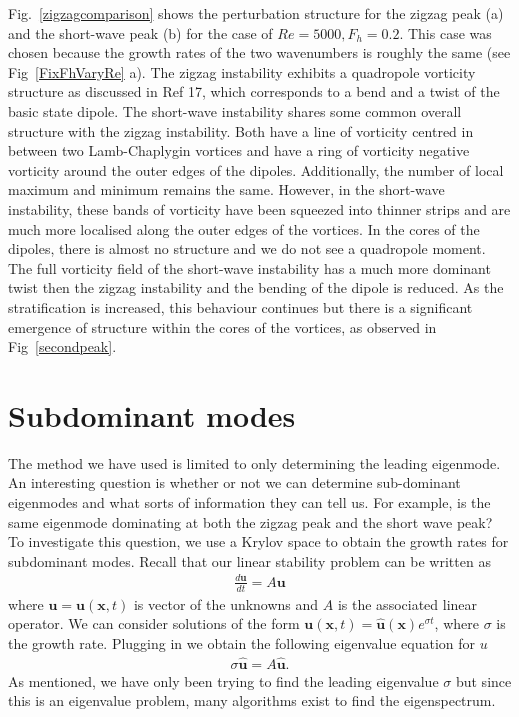 Fig.~\ref{zigzagcomparison} shows the perturbation structure for the zigzag peak (a) and the short-wave peak (b) for the case of $Re=5000,F_{h}=0.2$. This case was chosen because the growth rates of the two wavenumbers is roughly the same (see Fig~\ref{FixFhVaryRe} a). The zigzag instability exhibits a quadropole vorticity structure as discussed in Ref 17\nocite{bc2000c}, which corresponds to a bend and a twist of the basic state dipole. The short-wave instability shares some common overall structure with the zigzag instability. Both have a line of vorticity centred in between two Lamb-Chaplygin vortices and have a ring of vorticity negative vorticity around the outer edges of the dipoles. Additionally, the number of local maximum and minimum remains the same. However, in the short-wave instability, these bands of vorticity have been squeezed into thinner strips and are much more localised along the outer edges of the vortices. In the cores of the dipoles, there is almost no structure and we do not see a quadropole moment. The full vorticity field of the short-wave instability has a much more dominant twist then the zigzag instability and the bending of the dipole is reduced. As the stratification is increased, this behaviour continues but there is a significant emergence of structure within the cores of the vortices, as observed in Fig~\ref{secondpeak}.


\section{Subdominant modes}
The method we have used is limited to only determining the leading eigenmode. An interesting question is whether or not we can determine sub-dominant eigenmodes and what sorts of information they can tell us. For example, is the same eigenmode dominating at both the zigzag peak and the short wave peak? To investigate this question, we use a Krylov space to obtain the growth rates for subdominant modes. Recall that our linear stability problem can be written as 
\begin{align}
\frac{d\bm{u}}{dt} = A\bm{u}
\end{align}
where $\bm{u}=\bm{u}(\bm{x},t)$ is vector of the unknowns and $A$ is the associated linear operator. We can consider solutions of the form $\bm{u}(\bm{x},t)=\hat{\bm{u}}(\bm{x})e^{\sigma t}$, where $\sigma$ is the growth rate. Plugging in we obtain the following eigenvalue equation for $u$
\begin{align}
\sigma \hat{\bm{u}} = A\hat{\bm{u}}.
\end{align}
As mentioned, we have only been trying to find the leading eigenvalue $\sigma$ but since this is an eigenvalue problem, many algorithms exist to find the eigenspectrum. 

